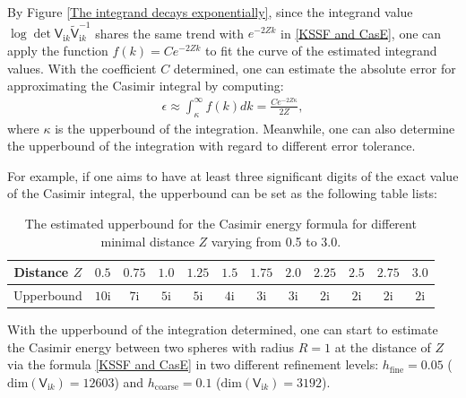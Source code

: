 \begin{remark}\label{remark for upperbound determination}
    By Figure \ref{The integrand decays exponentially}, since the integrand value $\log\det\mathsf{V}_{\mathrm{i}k}\tilde{\mathsf{V}}_{\mathrm{i}k}^{-1}$ 
    shares the same trend with $e^{-2Zk}$ in \eqref{KSSF and CasE}, one can apply the function $f(k) = Ce^{-2Zk}$ to fit the curve of the estimated integrand
    values. With the coefficient $C$ determined, one can estimate the absolute error for approximating the Casimir integral by computing:  
    \begin{align*}
        \epsilon \approx \int_{\kappa}^{\infty}f(k)dk = \frac{Ce^{-2Z\kappa}}{2Z},
    \end{align*}
    where $\kappa$ is the upperbound of the integration. 
Meanwhile, one can also determine the upperbound of the integration with regard to different error tolerance. 

For example, if one aims to have at least three significant digits of the exact value of the Casimir integral, the upperbound can be set as the following 
table lists:

\begin{table}[H]
    \centering
    \begin{tabular}{ |c|c|c|c|c|c|c|c|c|c|c|c| }
        \hline
        Distance $Z$ & $ 0.5$ & $ 0.75$  & $ 1.0$ & $1.25$ & $ 1.5$ & $1.75$  & $2.0$ & $2.25$ & $ 2.5$ & $ 2.75$  & $3.0$ \\\hline
        Upperbound & $10\mathrm{i}$ & $7\mathrm{i}$ & $5\mathrm{i}$ & $5\mathrm{i}$ & $4\mathrm{i}$ & $3\mathrm{i}$ & $3\mathrm{i}$ & $2\mathrm{i}$ & $2\mathrm{i}$ & $2\mathrm{i}$ & $2\mathrm{i}$ \\\hline
       \end{tabular}
       \caption{\label{Equal: distance and upperbound error tolerance} The estimated upperbound for the Casimir energy formula for different minimal distance $Z$ varying from 
       0.5 to 3.0.}
\end{table}
\end{remark}

With the upperbound of the integration determined, one can start to estimate the Casimir energy between two spheres with radius $R = 1$ at the 
distance of $Z$ via the formula \eqref{KSSF and CasE} in two different refinement levels: $h_{\text{fine}} = 0.05$ 
($\text{dim}(\mathsf{V}_{\mathrm{i}k}) = 12603$) and $h_{\text{coarse}} = 0.1$ ($\text{dim}(\mathsf{V}_{\mathrm{i}k}) = 3192$).

